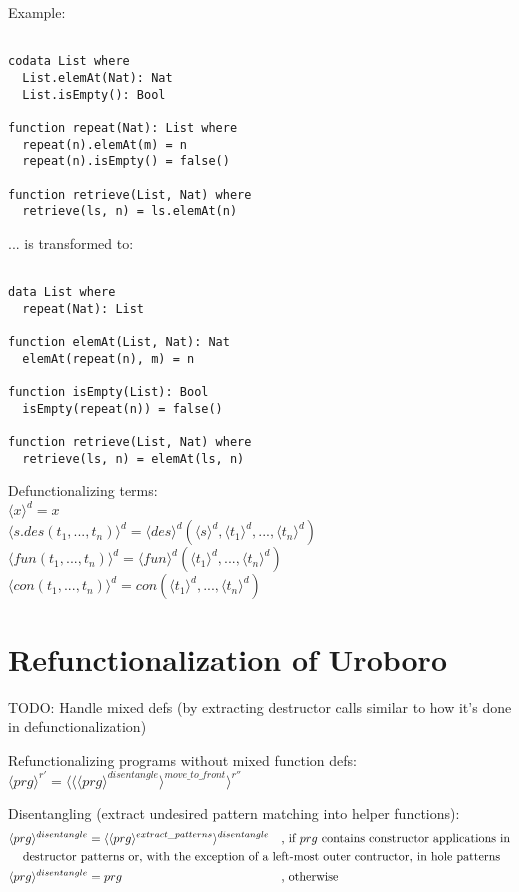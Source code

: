\documentclass[11pt]{article} %
\begin{document}
Example:

\begin{lstlisting}

codata List where
  List.elemAt(Nat): Nat
  List.isEmpty(): Bool

function repeat(Nat): List where
  repeat(n).elemAt(m) = n
  repeat(n).isEmpty() = false()

function retrieve(List, Nat) where
  retrieve(ls, n) = ls.elemAt(n)

\end{lstlisting}

... is transformed to:

\begin{lstlisting}

data List where
  repeat(Nat): List

function elemAt(List, Nat): Nat
  elemAt(repeat(n), m) = n

function isEmpty(List): Bool
  isEmpty(repeat(n)) = false()

function retrieve(List, Nat) where
  retrieve(ls, n) = elemAt(ls, n)

\end{lstlisting}

Defunctionalizing terms: \\
$\langle x \rangle^d = x$ \\
$\langle s.des(t_1, ..., t_n) \rangle^d = \langle des \rangle^d (\langle s \rangle^d, \langle t_1 \rangle^d, ..., \langle t_n \rangle^d)$ \\
$\langle fun(t_1, ..., t_n) \rangle^d = \langle fun \rangle^d (\langle t_1 \rangle^d, ..., \langle t_n \rangle^d)$ \\
$\langle con(t_1, ..., t_n) \rangle^d = con(\langle t_1 \rangle^d, ..., \langle t_n \rangle^d)$ \\

\section{Refunctionalization of Uroboro}

TODO: Handle mixed defs (by extracting destructor calls similar to how it's done in defunctionalization)

Refunctionalizing programs without mixed function defs: $\langle prg \rangle^{r'} = \langle \langle \langle prg \rangle^{disentangle} \rangle^{move\_to\_front} \rangle^{r''}$

Disentangling (extract undesired pattern matching into helper functions):
\begin{alignat*}{2}
\langle prg \rangle^{disentangle} & = \langle \langle prg \rangle^{extract\_patterns} \rangle^{disentangle} &&\textrm{, if } prg \textrm{ contains constructor applications in} \\
\quad \textrm{destructor patterns or, with the exception of a left-most outer contructor, in hole patterns } \span\span\span \\
\langle prg \rangle^{disentangle} & = prg &&\textrm{, otherwise}
\end{alignat*}
\end{document}
